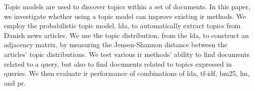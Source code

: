 Topic models are used to discover topics within a set of documents.
In this paper, we investigate whether using a topic model can improve existing \gls{ir} methods.
We employ the probabilistic topic model, \gls{lda}, to automatically extract topics from Danish news articles.
We use the topic distribution, from the \gls{lda}, to construct an adjacency matrix, by measuring the Jensen-Shannon distance between the articles' topic distributions.
We test various \gls{ir} methods' ability to find documents related to a query, but also to find documents related to topics expressed in queries.
We then evaluate \gls{ir} performance of combinations of \gls{lda}, \gls{tf-idf}, \gls{bm25}, \gls{lm}, and \gls{pr}.
